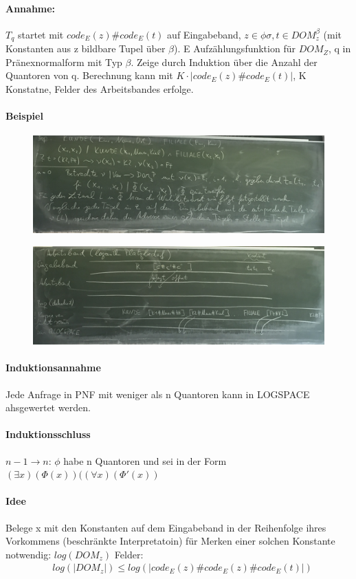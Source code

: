 \documentclass[12pt, a4paper]{article}
\begin{document}
\paragraph{Annahme:} $T_q$ startet mit $code_E(z)\#code_E(t)$ auf Eingabeband, $z \in \phi\sigma, t \in DOM^\beta_z$ (mit Konstanten aus z bildbare Tupel über $\beta$). E Aufzählungsfunktion für $DOM_Z$, q in Pränexnormalform mit Typ $\beta$. Zeige durch Induktion über die Anzahl der Quantoren von q. Berechnung kann mit $K \cdot  |code_E(z)\#code_E(t)|$, K Konstatne, Felder des Arbeitsbandes erfolge.

\paragraph*{Beispiel}
\begin{figure}[h!]
\centering
\includegraphics[width=0.7\linewidth]{img/img25}
\caption{}
\label{fig:img25}
\end{figure}
\begin{figure}[h!]
\centering
\includegraphics[width=0.7\linewidth]{img/img26}
\caption{}
\label{fig:img26}
\end{figure}

\paragraph{Induktionsannahme}
Jede Anfrage in PNF mit weniger als n Quantoren kann in LOGSPACE ahsgewertet werden.

\paragraph{Induktionsschluss}
$n-1 \rightarrow n$: $\phi$ habe n Quantoren und sei in der Form $(\exists x)(\Phi(x))((\forall x)(\Phi'(x))$

\paragraph{Idee}
Belege x mit den Konstanten auf dem Eingabeband in der Reihenfolge ihres Vorkommens (beschränkte Interpretatoin) für Merken einer solchen Konstante notwendig: $log(DOM_z)$ Felder:
\begin{align*}
&log(|DOM_z|) \le log(|code_E(z)\# code_E(z) \# code_E(t)|)
\end{align*}
\end{document}
